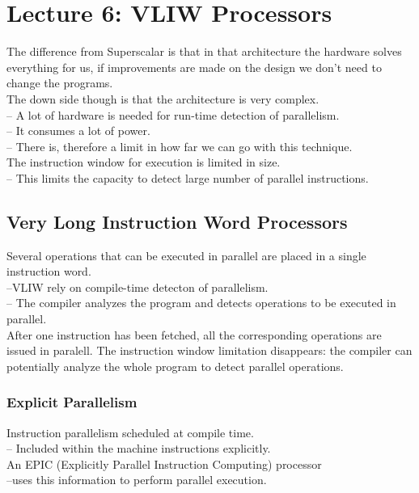 \documentclass[titlepage, a4paper]{article}
\begin{document}
\section{Lecture 6: VLIW Processors}
The difference from Superscalar is that in that architecture the hardware solves everything for us, if improvements are made on the design we don't need to change the programs. \\
The down side though is that the architecture is very complex. \\
-- A lot of hardware is needed for run-time detection of parallelism. \\
-- It consumes a lot of power. \\
-- There is, therefore a limit in how far we can go with this technique. \\

The instruction window for execution is limited in size. \\
-- This limits the capacity to detect large number of parallel instructions.

\subsection{Very Long Instruction Word Processors}
Several operations that can be executed in parallel are placed in a single instruction word. \\
--VLIW rely on compile-time detecton of parallelism. \\
-- The compiler analyzes the program and detects operations to be executed in parallel. \\

After one instruction has been fetched, all the corresponding operations are issued in paralell.
The instruction window limitation disappears: the compiler can potentially analyze the whole program to detect parallel operations.

\subsubsection{Explicit Parallelism}
Instruction parallelism scheduled at compile time.\\
-- Included within the machine instructions explicitly.\\

An EPIC (Explicitly Parallel Instruction Computing) processor \\
--uses this information to perform parallel execution. \\
\end{document}
